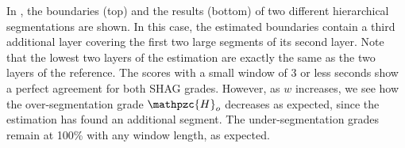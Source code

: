 \documentclass{article}
\def\shag{\ensuremath{\mathpzc{H}}}
\begin{document}

In , the boundaries (top) and the results (bottom) of two different hierarchical segmentations are shown.
In this case, the estimated boundaries contain a third additional layer covering the first two large segments of its second layer.
Note that the lowest two layers of the estimation are exactly the same as the two layers of the reference.
The scores with a small window of 3 or less seconds show a perfect agreement for both SHAG grades.
However, as $w$ increases, we see how the over-segmentation grade $\shag_o$ decreases as expected, since the estimation has found an additional segment.
The under-segmentation grades remain at 100\% with any window length, as expected.
\end{document}
